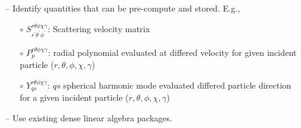 \documentclass[landscape,archE,fontscale=0.285]{baposter} %
\begin{document}
\begin{poster}
{\begin{itemize}[leftmargin=*]
\item[--] Identify quantities that can be pre-compute and stored. E.g.,
\begin{itemize}[leftmargin=*]
\small
\item[$\circ$] $S^{r\theta\phi\chi\gamma}_{r^\prime\theta^\prime \phi^\prime}$: Scattering velocity matrix
\item[$\circ$] $P^{r\theta\phi\chi\gamma}_{p}$: radial polynomial evaluated at differed velocity for given incident particle ($r,\theta,\phi,\chi,\gamma$)
\item[$\circ$] $Y^{r\theta\phi\chi\gamma}_{qs}$: $qs$ spherical harmonic mode evaluated differed particle direction for a given incident particle ($r,\theta,\phi,\chi,\gamma$)
\end{itemize}
\item[--] Use existing dense linear algebra packages.
\end{itemize}
}


\end{poster}
\end{document}
